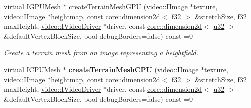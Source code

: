 \begin{DoxyCompactItemize}
\item 
virtual \hyperlink{classirr_1_1scene_1_1IMesh}{I\+G\+P\+U\+Mesh} $\ast$ \hyperlink{classirr_1_1scene_1_1IGeometryCreator_a687cc4dc19a40ab892d6a18cb9c6f86e}{create\+Terrain\+Mesh\+G\+PU} (\hyperlink{classirr_1_1video_1_1IImage}{video\+::\+I\+Image} $\ast$texture, \hyperlink{classirr_1_1video_1_1IImage}{video\+::\+I\+Image} $\ast$heightmap, const \hyperlink{classirr_1_1core_1_1dimension2d}{core\+::dimension2d}$<$ \hyperlink{namespaceirr_a0277be98d67dc26ff93b1a6a1d086b07}{f32} $>$ \&stretch\+Size, \hyperlink{namespaceirr_a0277be98d67dc26ff93b1a6a1d086b07}{f32} max\+Height, \hyperlink{classirr_1_1video_1_1IVideoDriver}{video\+::\+I\+Video\+Driver} $\ast$driver, const \hyperlink{classirr_1_1core_1_1dimension2d}{core\+::dimension2d}$<$ \hyperlink{namespaceirr_a0416a53257075833e7002efd0a18e804}{u32} $>$ \&default\+Vertex\+Block\+Size, bool debug\+Borders=false) const  =0
\begin{DoxyCompactList}\small\item\em Create a terrain mesh from an image representing a heightfield. \end{DoxyCompactList}\item 
virtual \hyperlink{classirr_1_1scene_1_1IMesh}{I\+C\+P\+U\+Mesh} $\ast$ {\bfseries create\+Terrain\+Mesh\+C\+PU} (\hyperlink{classirr_1_1video_1_1IImage}{video\+::\+I\+Image} $\ast$texture, \hyperlink{classirr_1_1video_1_1IImage}{video\+::\+I\+Image} $\ast$heightmap, const \hyperlink{classirr_1_1core_1_1dimension2d}{core\+::dimension2d}$<$ \hyperlink{namespaceirr_a0277be98d67dc26ff93b1a6a1d086b07}{f32} $>$ \&stretch\+Size, \hyperlink{namespaceirr_a0277be98d67dc26ff93b1a6a1d086b07}{f32} max\+Height, \hyperlink{classirr_1_1video_1_1IVideoDriver}{video\+::\+I\+Video\+Driver} $\ast$driver, const \hyperlink{classirr_1_1core_1_1dimension2d}{core\+::dimension2d}$<$ \hyperlink{namespaceirr_a0416a53257075833e7002efd0a18e804}{u32} $>$ \&default\+Vertex\+Block\+Size, bool debug\+Borders=false) const  =0\hypertarget{classirr_1_1scene_1_1IGeometryCreator_a534d5cc0c557daaf3ee9160c24866ddd}{}\label{classirr_1_1scene_1_1IGeometryCreator_a534d5cc0c557daaf3ee9160c24866ddd}


\end{DoxyCompactItemize}
